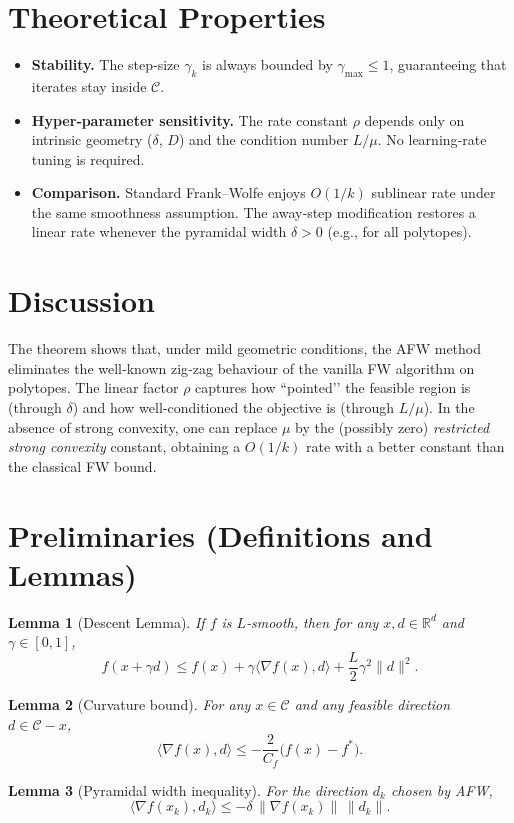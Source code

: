 \documentclass{article}
\newtheorem{lemma}{Lemma}
\newcommand{\R}{\mathbb{R}}
\newcommand{\C}{\mathcal{C}}
\begin{document}
\section*{Theoretical Properties}
\begin{itemize}
\item \textbf{Stability.} The step‑size $\gamma_{k}$ is always bounded by $\gamma_{\max}\le1$, guaranteeing that iterates stay inside $\C$.
\item \textbf{Hyper‑parameter sensitivity.} The rate constant $\rho$ depends only on intrinsic geometry ($\delta$, $D$) and the condition number $L/\mu$. No learning‑rate tuning is required.
\item \textbf{Comparison.} Standard Frank–Wolfe enjoys $O(1/k)$ sublinear rate under the same smoothness assumption. The away‑step modification restores a linear rate whenever the pyramidal width $\delta>0$ (e.g., for all polytopes).
\end{itemize}

\section*{Discussion}
The theorem shows that, under mild geometric conditions, the AFW method eliminates the well‑known zig‑zag behaviour of the vanilla FW algorithm on polytopes. The linear factor $\rho$ captures how “pointed’’ the feasible region is (through $\delta$) and how well‑conditioned the objective is (through $L/\mu$). In the absence of strong convexity, one can replace $\mu$ by the (possibly zero) \emph{restricted strong convexity} constant, obtaining a $O(1/k)$ rate with a better constant than the classical FW bound.

\section*{Preliminaries (Definitions and Lemmas)}
\begin{lemma}[Descent Lemma]\label{lem:descent}
If $f$ is $L$‑smooth, then for any $x,d\in\R^{d}$ and $\gamma\in[0,1]$,
\[
f(x+\gamma d)\le f(x)+\gamma\langle\nabla f(x),d\rangle+\frac{L}{2}\gamma^{2}\|d\|^{2}.
\]
\end{lemma}
\begin{lemma}[Curvature bound]\label{lem:curvature}
For any $x\in\C$ and any feasible direction $d\in\C-x$,
\[
\langle \nabla f(x),d\rangle\le -\frac{2}{C_{f}}\bigl(f(x)-f^{*}\bigr).
\]
\end{lemma}
\begin{lemma}[Pyramidal width inequality]\label{lem:pyr}
For the direction $d_{k}$ chosen by AFW,
\[
\langle \nabla f(x_{k}),d_{k}\rangle\le -\delta\,\|\nabla f(x_{k})\|\,\|d_{k}\|.
\]
\end{lemma}
\end{document}

